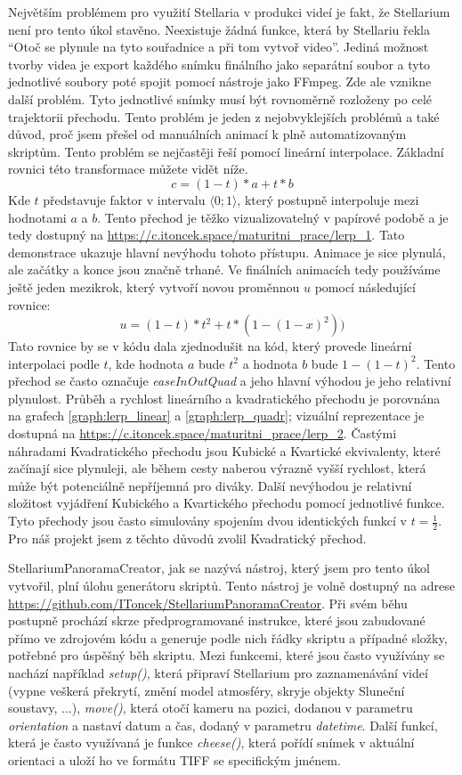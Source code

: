 \documentclass[12pt,a4paper,titlepage]{article}
\begin{document}
Největším problémem pro využití Stellaria v produkci videí je fakt, že Stellarium není pro tento úkol stavěno. Neexistuje žádná funkce, která by Stellariu řekla \enquote{Otoč se plynule na tyto souřadnice a při tom vytvoř video}. Jediná možnost tvorby videa je export každého snímku finálního jako separátní soubor a tyto jednotlivé soubory poté spojit pomocí nástroje jako FFmpeg. Zde ale vznikne další problém. Tyto jednotlivé snímky musí být rovnoměrně rozloženy po celé trajektorii přechodu. Tento problém je jeden z nejobvyklejších problémů a také důvod, proč jsem přešel od manuálních animací k plně automatizovaným skriptům. Tento problém se nejčastěji řeší pomocí lineární interpolace. Základní rovnici této transformace můžete vidět níže.
\[c = (1-t)*a + t * b\] 
Kde $t$ představuje faktor v intervalu $\langle0;1\rangle$, který postupně interpoluje mezi hodnotami $a$ a $b$. Tento přechod je těžko vizualizovatelný v papírové podobě a je tedy dostupný na \url{https://c.itoncek.space/maturitni_prace/lerp_1}. Tato demonstrace ukazuje hlavní nevýhodu tohoto přístupu. Animace je sice plynulá, ale začátky a konce jsou značně trhané. Ve finálních animacích tedy používáme ještě jeden mezikrok, který vytvoří novou proměnnou $u$ pomocí následující rovnice:
\[u = (1 - t) * t^2 + t * (1-(1-x)^2))\]
Tato rovnice by se v kódu dala zjednodušit na kód, který provede lineární interpolaci podle $t$, kde hodnota $a$ bude $t^{2}$ a hodnota $b$ bude $1-(1-t)^{2}$. Tento přechod se často označuje \textit{easeInOutQuad} a jeho hlavní výhodou je jeho relativní plynulost. Průběh a rychlost lineárního a kvadratického přechodu je porovnána na grafech \ref{graph:lerp_linear} a \ref{graph:lerp_quadr}; vizuální reprezentace je dostupná na \url{https://c.itoncek.space/maturitni_prace/lerp_2}. Častými náhradami Kvadratického přechodu jsou Kubické a Kvartické ekvivalenty, které začínají sice plynuleji, ale během cesty naberou výrazně vyšší rychlost, která může být potenciálně nepříjemná pro diváky. Další nevýhodou je relativní složitost vyjádření Kubického a Kvartického přechodu pomocí jednotlivé funkce. Tyto přechody jsou často simulovány spojením dvou identických funkcí v $t=\frac{1}{2}$. Pro náš projekt jsem z těchto důvodů zvolil Kvadratický přechod.

StellariumPanoramaCreator, jak se nazývá nástroj, který jsem pro tento úkol vytvořil, plní úlohu generátoru skriptů. Tento nástroj je volně dostupný na adrese \url{https://github.com/IToncek/StellariumPanoramaCreator}. Při svém běhu postupně prochází skrze předprogramované instrukce, které jsou zabudované přímo ve zdrojovém kódu a generuje podle nich řádky skriptu a případné složky, potřebné pro úspěšný běh skriptu. Mezi funkcemi, které jsou často využívány se nachází například \textit{setup()}, která připraví Stellarium pro zaznamenávání videí (vypne veškerá překrytí, změní model atmosféry, skryje objekty Sluneční soustavy, ...), \textit{move()}, která otočí kameru na pozici, dodanou v parametru \textit{orientation} a nastaví datum a čas, dodaný v parametru \textit{datetime}. Další funkcí, která je často využívaná je funkce \textit{cheese()}, která pořídí snímek v aktuální orientaci a uloží ho ve formátu TIFF se specifickým jménem.
\end{document}
